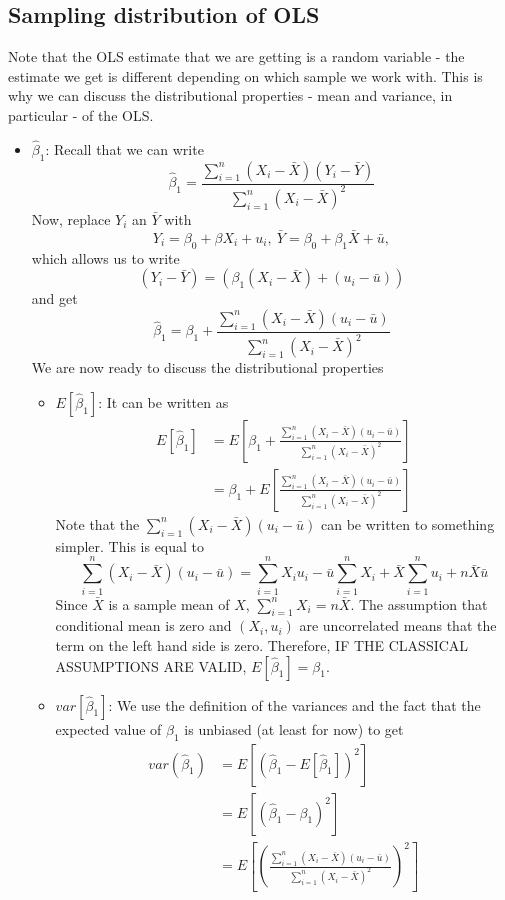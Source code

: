 \documentclass[12pt]{article}
\theoremstyle{definition}
\theoremstyle{property}
\theoremstyle{assumption}
\theoremstyle{example}
\theoremstyle{comment}
\begin{document}
\subsection{Sampling distribution of OLS}
Note that the OLS estimate that we are getting is a random variable - the estimate we get is different depending on which sample we work with. This is why we can discuss the distributional properties - mean and variance, in particular - of the OLS. 
\begin{itemize}
\item $\hat{\beta}_1$: Recall that we can write
\[
\hat{\beta}_1= \frac{\sum_{i=1}^n(X_i-\bar{X})(Y_i-\bar{Y})}{\sum_{i=1}^n(X_i-\bar{X})^2}
\]
Now, replace $Y_i$ an $\bar{Y}$ with 
\[
Y_i =\beta_0 + \beta X_i + u_i, \ \bar{Y} = \beta_0 + \beta_1\bar{X} + \bar{u},
\]
which allows us to write 
\[
(Y_i-\bar{Y}) = (\beta_1(X_i-\bar{X})+(u_i-\bar{u}))
\]
and get
\[
\hat{\beta}_1=\beta_1+  \frac{\sum_{i=1}^n(X_i-\bar{X})(u_i-\bar{u})}{\sum_{i=1}^n(X_i-\bar{X})^2}
\]
We are now ready to discuss the distributional properties
\begin{itemize}
\item $E[\hat{\beta}_1]$: It can be written as
\[
\begin{aligned}
E[\hat{\beta}_1]& = E\left[\beta_1+  \frac{\sum_{i=1}^n(X_i-\bar{X})(u_i-\bar{u})}{\sum_{i=1}^n(X_i-\bar{X})^2}\right]\\
&=\beta_1+ E\left[\frac{\sum_{i=1}^n(X_i-\bar{X})(u_i-\bar{u})}{\sum_{i=1}^n(X_i-\bar{X})^2}\right]
\end{aligned}
\]
Note that the $\sum_{i=1}^n(X_i-\bar{X})(u_i-\bar{u})$ can be written to something simpler. This is equal to
\[
\sum_{i=1}^n(X_i-\bar{X})(u_i-\bar{u})=\sum_{i=1}^nX_iu_i-\bar{u}\sum_{i=1}^n X_i+\bar{X}\sum_{i=1}^nu_i+n\bar{X}\bar{u}
\]
Since $\bar{X}$ is a sample mean of $X$, $\sum_{i=1}^nX_i=n\bar{X}$. The assumption that conditional mean is zero and $(X_i, u_i)$ are uncorrelated means that the term on the left hand side is zero. Therefore, IF THE CLASSICAL ASSUMPTIONS ARE VALID, $E[\hat{\beta}_1]=\beta_1$.
\item $var[\hat{\beta}_1]$: We use the definition of the variances and the fact that the expected value of $\hat{\beta}_1$ is unbiased (at least for now) to get
\[
\begin{aligned}
var(\hat{\beta}_1)&=E\left[\left(\hat{\beta}_1-E[\hat{\beta}_1]\right)^2\right] \\
&=E\left[\left(\hat{\beta}_1-{\beta}_1\right)^2\right]\\
&=E\left[\left( \frac{\sum_{i=1}^n(X_i-\bar{X})(u_i-\bar{u})}{\sum_{i=1}^n(X_i-\bar{X})^2} \right)^2\right]\\

\end{aligned}\]
\end{itemize}
\end{itemize}
\end{document}
